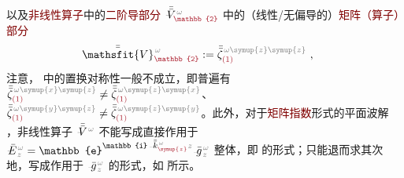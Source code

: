 以及\textcolor{Maroon}{非线性算子}中的\textcolor{Maroon}{二阶导部分} $\Xint{\mathcolor{gray}{-}}{21}{\bar{\bar{V}}}^{\;\! \mathcolor{gray}{\omega}}_{\textcolor{Maroon}{\mathbb{2}}}$ 中的（线性/无偏导的）\textcolor{Maroon}{矩阵（算子）部分}
\begin{align} \label{eq:matrix_exp-V2}
	\Xint{\mathcolor{gray}{-}}{25}{\bar{\bar{\mathsfit{V}}}}^{\;\! \mathcolor{gray}{\omega}}_{\textcolor{Maroon}{\mathbb{2}}} := \bar{\bar{\zeta}}^{\;\! \mathcolor{gray}{\omega} \mathcolor{gray}{\symup{z} \symup{z}}}_{\textcolor{Maroon}{(1)}} ~, 
\end{align}
注意， 中的置换对称性一般不成立，即普遍有 $\bar{\bar{\zeta}}^{\;\! \mathcolor{gray}{\omega} \mathcolor{gray}{\symup{x} \symup{z}}}_{\textcolor{Maroon}{(1)}} \neq \bar{\bar{\zeta}}^{\;\! \mathcolor{gray}{\omega} \mathcolor{gray}{\symup{z} \symup{x}}}_{\textcolor{Maroon}{(1)}}$、 $\bar{\bar{\zeta}}^{\;\! \mathcolor{gray}{\omega} \mathcolor{gray}{\symup{y} \symup{z}}}_{\textcolor{Maroon}{(1)}} \neq \bar{\bar{\zeta}}^{\;\! \mathcolor{gray}{\omega} \mathcolor{gray}{\symup{z} \symup{y}}}_{\textcolor{Maroon}{(1)}}$。此外，对于\textcolor{Maroon}{矩阵指数}形式的平面波解 ，非线性算子 $\Xint{\mathcolor{gray}{-}}{21}{\bar{\bar{V}}}^{\;\! \mathcolor{gray}{\omega}}$ 不能写成直接作用于 $\Xint{\mathcolor{gray}{-}}{25}{\bar{E}}^{\;\!\mathcolor{gray}{\omega}}_{\;\! \mathcolor{gray}{z}} = \mathbb{e}^{\mathbb{i} \Xint{\begin{smallmatrix} ~ \\ {}^{}_{\mathcolor{gray}{-}} \\ ~ \end{smallmatrix}}{15}{\bar{\bar{k}}}_{\textcolor{Maroon}{\symup{z}}}^{\;\! \mathcolor{gray}{\omega}} \mathcolor{gray}{z}} \Xint{{}^{}_{\mathcolor{gray}{-}}}{10}{\bar{g}}^{\;\!\mathcolor{gray}{\omega}}_{\;\! \mathcolor{gray}{z}}$ 整体，即  的形式；只能退而求其次地，写成作用于 $\Xint{{}^{}_{\mathcolor{gray}{-}}}{10}{\bar{g}}^{\;\!\mathcolor{gray}{\omega}}_{\;\! \mathcolor{gray}{z}}$ 的形式，如  所示。


